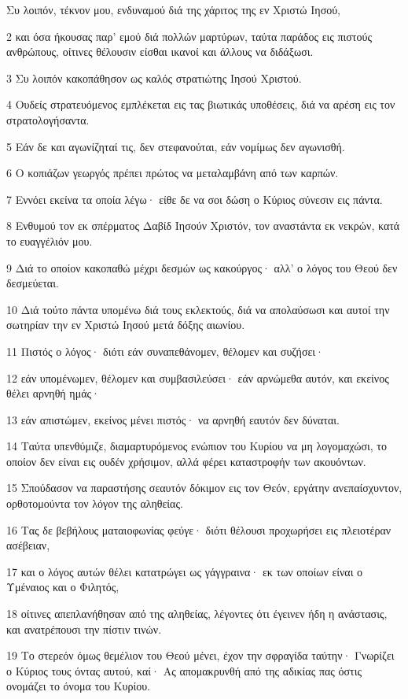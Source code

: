 \par Συ λοιπόν, τέκνον μου, ενδυναμού διά της χάριτος της εν Χριστώ Ιησού,
\par 2 και όσα ήκουσας παρ' εμού διά πολλών μαρτύρων, ταύτα παράδος εις πιστούς ανθρώπους, οίτινες θέλουσιν είσθαι ικανοί και άλλους να διδάξωσι.
\par 3 Συ λοιπόν κακοπάθησον ως καλός στρατιώτης Ιησού Χριστού.
\par 4 Ουδείς στρατευόμενος εμπλέκεται εις τας βιωτικάς υποθέσεις, διά να αρέση εις τον στρατολογήσαντα.
\par 5 Εάν δε και αγωνίζηταί τις, δεν στεφανούται, εάν νομίμως δεν αγωνισθή.
\par 6 Ο κοπιάζων γεωργός πρέπει πρώτος να μεταλαμβάνη από των καρπών.
\par 7 Εννόει εκείνα τα οποία λέγω· είθε δε να σοι δώση ο Κύριος σύνεσιν εις πάντα.
\par 8 Ενθυμού τον εκ σπέρματος Δαβίδ Ιησούν Χριστόν, τον αναστάντα εκ νεκρών, κατά το ευαγγέλιόν μου.
\par 9 Διά το οποίον κακοπαθώ μέχρι δεσμών ως κακούργος· αλλ' ο λόγος του Θεού δεν δεσμεύεται.
\par 10 Διά τούτο πάντα υπομένω διά τους εκλεκτούς, διά να απολαύσωσι και αυτοί την σωτηρίαν την εν Χριστώ Ιησού μετά δόξης αιωνίου.
\par 11 Πιστός ο λόγος· διότι εάν συναπεθάνομεν, θέλομεν και συζήσει·
\par 12 εάν υπομένωμεν, θέλομεν και συμβασιλεύσει· εάν αρνώμεθα αυτόν, και εκείνος θέλει αρνηθή ημάς·
\par 13 εάν απιστώμεν, εκείνος μένει πιστός· να αρνηθή εαυτόν δεν δύναται.
\par 14 Ταύτα υπενθύμιζε, διαμαρτυρόμενος ενώπιον του Κυρίου να μη λογομαχώσι, το οποίον δεν είναι εις ουδέν χρήσιμον, αλλά φέρει καταστροφήν των ακουόντων.
\par 15 Σπούδασον να παραστήσης σεαυτόν δόκιμον εις τον Θεόν, εργάτην ανεπαίσχυντον, ορθοτομούντα τον λόγον της αληθείας.
\par 16 Τας δε βεβήλους ματαιοφωνίας φεύγε· διότι θέλουσι προχωρήσει εις πλειοτέραν ασέβειαν,
\par 17 και ο λόγος αυτών θέλει κατατρώγει ως γάγγραινα· εκ των οποίων είναι ο Υμέναιος και ο Φιλητός,
\par 18 οίτινες απεπλανήθησαν από της αληθείας, λέγοντες ότι έγεινεν ήδη η ανάστασις, και ανατρέπουσι την πίστιν τινών.
\par 19 Το στερεόν όμως θεμέλιον του Θεού μένει, έχον την σφραγίδα ταύτην· Γνωρίζει ο Κύριος τους όντας αυτού, καί· Ας απομακρυνθή από της αδικίας πας όστις ονομάζει το όνομα του Κυρίου.
